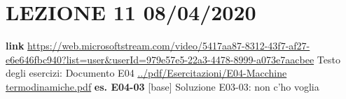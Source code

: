 \section*{LEZIONE 11 08/04/2020}
\textbf{link} \url{https://web.microsoftstream.com/video/5417aa87-8312-43f7-af27-e6e646fbc940?list=user&userId=979e57e5-22a3-4478-8999-a073e7aacbee}\newline
\newline
Testo degli esercizi:\newline
Documento E04 \url{../pdf/Esercitazioni/E04-Macchine termodinamiche.pdf}\newline
\textbf{es. E04-03} [base]\newline
Soluzione E03-03: non c'ho voglia